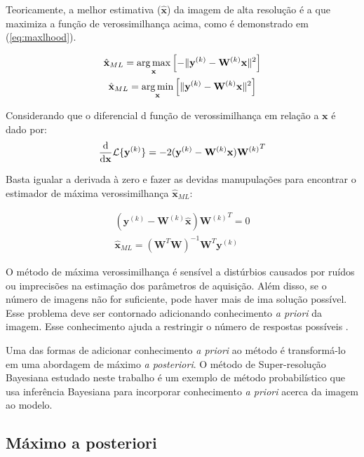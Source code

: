 Teoricamente, a melhor estimativa ($\hat{\mathbf{x}}$) da imagem de alta resolução é a
que maximiza a função de verossimilhança acima, como é demonstrado em (\ref{eq:maxlhood}).

\begin{gather}
	\label{eq:maxlhood}
	\hat{\mathbf{x}}_{ML} = \operatorname*{arg\,max}_{\mathbf{x}}
	\left[ - \|\mathbf{y}^{(k)} - \mathbf{W}^{(k)}\mathbf{x}\|^2 
	\right ] \\
	\hat{\mathbf{x}}_{ML} = \operatorname*{arg\,min}_{\mathbf{x}}
	\left[ \|\mathbf{y}^{(k)} - \mathbf{W}^{(k)}\mathbf{x}\|^2 
	\right ] 
\end{gather}


Considerando que o diferencial d função de verossimilhança em relação a $\mathbf{x}$ é dado por:
\begin{equation}
	\frac{\mathrm{d}}{\mathrm{d} \mathbf{x}}
	\mathcal{L}\{\mathbf{y}^{(k)}\} = -2 (\mathbf{y}^{(k)} - \mathbf{W}^{(k)}\mathbf{x}) {\mathbf{W}^{(k)}}^T \\
\end{equation}

Basta igualar a derivada à zero e fazer as devidas manupulações para encontrar o estimador de máxima verossimilhança $\hat{\mathbf{x}}_{ML}$: 

\begin{gather}
	(\mathbf{y}^{(k)} - \mathbf{W}^{(k)}\hat{\mathbf{x}}) {\mathbf{W}^{(k)}}^T = 0 \\
	\hat{\mathbf{x}}_{ML} = (\mathbf{W}^T\mathbf{W})^{-1} \mathbf{W}^T \mathbf{y}^{(k)}
\end{gather}

O método de máxima verossimilhança é sensível a distúrbios causados por ruídos ou
imprecisões na estimação dos parâmetros de aquisição.
Além disso, se o número de imagens não for suficiente, pode haver mais de ima solução
possível. Esse problema deve ser contornado adicionando conhecimento \emph{a priori} da
imagem.
Esse conhecimento ajuda a restringir o número de respostas possíveis \cite{nasrollahi2014super}.

Uma das formas de adicionar conhecimento \emph{a priori} ao método é transformá-lo em
uma abordagem de máximo \emph{a posteriori}.
O método de Super-resolução Bayesiana estudado neste trabalho é um exemplo de método probabilístico que usa inferência Bayesiana para incorporar conhecimento \emph{a priori} acerca da imagem ao modelo.

\subsection{Máximo a posteriori}


